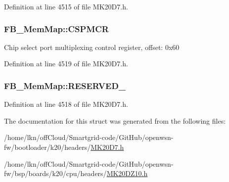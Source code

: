 Definition at line 4515 of file M\+K20\+D7.\+h.

\subsubsection[{\texorpdfstring{C\+S\+P\+M\+CR}{CSPMCR}}]{ F\+B\+\_\+\+Mem\+Map\+::\+C\+S\+P\+M\+CR}\hypertarget{struct_f_b___mem_map_a7876f1f5e2d0718968b09242af73b600}{}\label{struct_f_b___mem_map_a7876f1f5e2d0718968b09242af73b600}
Chip select port multiplexing control register, offset\+: 0x60 

Definition at line 4519 of file M\+K20\+D7.\+h.

\subsubsection[{\texorpdfstring{R\+E\+S\+E\+R\+V\+E\+D\+\_\+0}{RESERVED_0}}]{ F\+B\+\_\+\+Mem\+Map\+::\+R\+E\+S\+E\+R\+V\+E\+D\+\_}\hypertarget{struct_f_b___mem_map_a16a3f61c174bd6978f483ee0de4e9240}{}\label{struct_f_b___mem_map_a16a3f61c174bd6978f483ee0de4e9240}


Definition at line 4518 of file M\+K20\+D7.\+h.



The documentation for this struct was generated from the following files\+:\begin{DoxyCompactItemize}
\item 
/home/lkn/off\+Cloud/\+Smartgrid-\/code/\+Git\+Hub/openwsn-\/fw/bootloader/k20/headers/\hyperlink{bootloader_2k20_2headers_2_m_k20_d7_8h}{M\+K20\+D7.\+h}\item 
/home/lkn/off\+Cloud/\+Smartgrid-\/code/\+Git\+Hub/openwsn-\/fw/bsp/boards/k20/cpu/headers/\hyperlink{_m_k20_d_z10_8h}{M\+K20\+D\+Z10.\+h}\end{DoxyCompactItemize}
